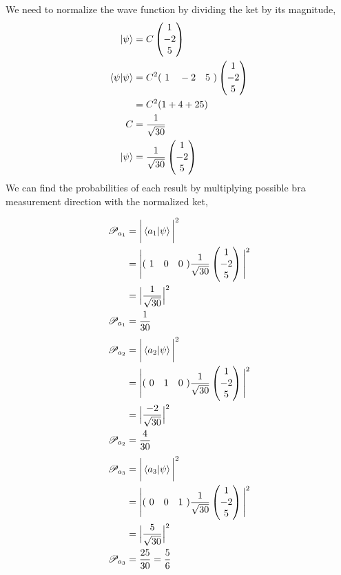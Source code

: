 \documentclass[paper=a4, fontsize=11pt]{scrartcl} %
\numberwithin{equation}{section} %
\numberwithin{figure}{section} %
\numberwithin{table}{section} %
\begin{document}
We need to normalize the wave function by dividing the ket by its magnitude,
\begin{align*}
\ket{\psi} & = C
\begin{pmatrix}
1\\-2\\5
\end{pmatrix} \\
\braket{\psi|\psi} & = C^2 (\ 1\quad -2\quad 5\ ) 
\begin{pmatrix}
1\\-2\\5
\end{pmatrix}\\
& = C^2(1+4+25) \\
C & = \frac{1}{\sqrt{30}}\\
\ket{\psi} & = \frac{1}{\sqrt{30}} 
\begin{pmatrix}
1\\-2\\5
\end{pmatrix}
\end{align*}
We can find the probabilities of each result by multiplying possible bra measurement direction with the normalized ket, 
\begin{multicols}{3}
\noindent
\begin{align*}
\mathscr{P}_{a_1} & = \bigg| \braket{a_1|\psi} \bigg|^2 \\
& = \Bigg| (\ 1\quad 0\quad 0\ ) 
\frac{1}{\sqrt{30}}\begin{pmatrix}
1\\-2\\5
\end{pmatrix} 
 \Bigg|^2 \\
& = \Big | 
\frac{1}{\sqrt{30}} 
  \Big |^2 \\
  \mathscr{P}_{a_1} & = \frac{1}{30}
\end{align*}
\begin{align*}
\mathscr{P}_{a_2} & = \bigg| \braket{a_2|\psi} \bigg|^2 \\
& = \Bigg| (\ 0\quad 1\quad 0\ ) 
\frac{1}{\sqrt{30}}\begin{pmatrix}
1\\-2\\5
\end{pmatrix} 
 \Bigg|^2 \\
& = \Big | 
\frac{-2}{\sqrt{30}} 
  \Big |^2 \\
  \mathscr{P}_{a_2} & = \frac{4}{30}
\end{align*}
\begin{align*}
\mathscr{P}_{a_3} & = \bigg| \braket{a_3|\psi} \bigg|^2 \\
& = \Bigg| (\ 0\quad 0\quad 1\ ) 
\frac{1}{\sqrt{30}}\begin{pmatrix}
1\\-2\\5
\end{pmatrix} 
 \Bigg|^2 \\
& = \Big | 
\frac{5}{\sqrt{30}} 
  \Big |^2 \\
  \mathscr{P}_{a_3  } & = \frac{25}{30} = \frac{5}{6}
\end{align*}
\end{multicols}
\end{document}
